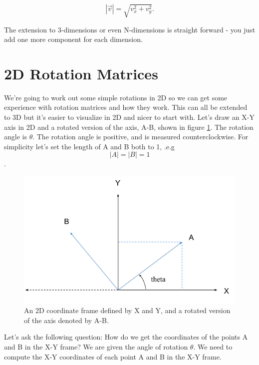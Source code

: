 \documentclass[11pt]{article}
\begin{document}
\begin{equation}    
|\vec{v}| = \sqrt{v_x^2 + v_y^2}.
\end{equation}

The extension to 3-dimensions or even N-dimensions is straight forward - you just add one more
component for each dimension.


\section{2D Rotation Matrices}
\label{sec:2d-rotation}

We’re going to work out some simple rotations in 2D so we can get some experience with
rotation matrices and how they work.  This can all be extended to 3D but it's easier to
visualize in 2D and nicer to start with.
\noindent
Let’s draw an X-Y axis in 2D and a rotated version of the axis, A-B, shown in figure \ref{fig:2d1}.
The rotation angle is $\theta$.  The rotation angle is positive, and is measured
counterclockwise.  For simplicity let’s set the length of A and B both to 1, 
.e.g \begin{equation} |A| = |B| = 1\end{equation}.

\begin{figure}[h!]
    \centering
    \includegraphics{figures/2d1.png}
    \caption{An 2D coordinate frame defined by X and Y, and a rotated version of the axis denoted by A-B.}
    \label{fig:2d1}
\end{figure}

Let's ask the following question: How do we get the coordinates of the points A and B
in the X-Y frame?  We are given the angle of rotation $\theta$.  We need to compute
the X-Y coordinates of each point A and B in the X-Y frame.
\end{document}

